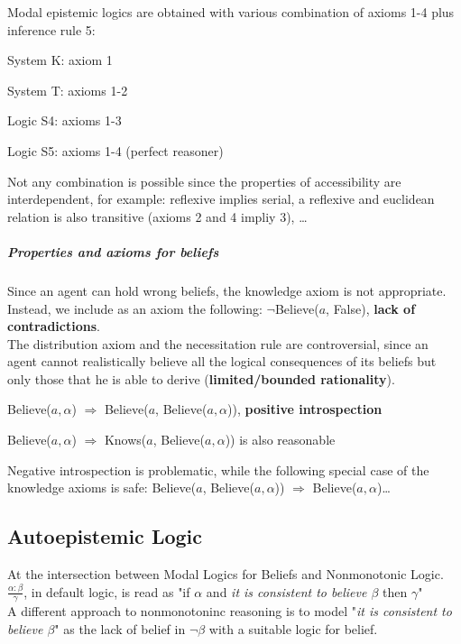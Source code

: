\documentclass[10pt]{report}
\begin{document}
Modal epistemic logics are obtained with various combination of axioms 1-4 plus inference rule 5:
\begin{list}{}{}
	\item System K: axiom 1
	\item System T: axioms 1-2
	\item Logic S4: axioms 1-3
	\item Logic S5: axioms 1-4 (perfect reasoner)
\end{list}
Not any combination is possible since the properties of accessibility are interdependent, for example: reflexive implies serial, a reflexive and euclidean relation is also transitive (axioms 2 and 4 impliy 3), \ldots
\subparagraph{Properties and axioms for beliefs} Since an agent can hold wrong beliefs, the knowledge axiom is not appropriate. Instead, we include as an axiom the following: $\neg$Believe($a$, False), \textbf{lack of contradictions}.\\The distribution axiom and the necessitation rule are controversial, since an agent cannot realistically believe all the logical consequences of its beliefs but only those that he is able to derive (\textbf{limited/bounded rationality}).
\begin{list}{}{}
	\item Believe($a,\alpha$) $\Rightarrow$ Believe($a$, Believe($a,\alpha$)), \textbf{positive introspection}
	\item Believe($a,\alpha$) $\Rightarrow$ Knows($a$, Believe($a,\alpha$)) is also reasonable
\end{list}
Negative introspection is problematic, while the following special case of the knowledge axioms is safe: Believe($a$, Believe($a,\alpha$)) $\Rightarrow$ Believe($a,\alpha$)\ldots
\subsection{Autoepistemic Logic}
At the intersection between Modal Logics for Beliefs and Nonmonotonic Logic.\\
$\frac{\alpha : \beta}{\gamma}$, in default logic, is read as "if $\alpha$ and \textit{it is consistent to believe $\beta$} then $\gamma$"\\
A different approach to nonmonotoninc reasoning is to model "\textit{it is consistent to believe $\beta$}" as the lack of belief in $\neg\beta$ with a suitable logic for belief.
\end{document}
